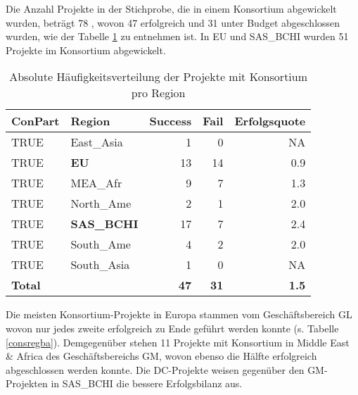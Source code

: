 %
%
Die Anzahl Projekte in der Stichprobe, die in einem Konsortium abgewickelt wurden, beträgt 78 , wovon 47 erfolgreich und 31 unter Budget abgeschlossen wurden, wie der Tabelle \ref{fcons} zu entnehmen ist. In EU und SAS\_BCHI wurden 51 Projekte im Konsortium abgewickelt.
\begin{table}[H]
	\centering
	\caption{Absolute Häufigkeitsverteilung der Projekte mit Konsortium pro Region}
	\begin{tabular}{lrrrr}
		\textbf{ConPart} & \multicolumn{1}{l}{\textbf{Region}} & \multicolumn{1}{l}{\textbf{Success}} & \multicolumn{1}{l}{\textbf{Fail}} & \multicolumn{1}{l}{\textbf{Erfolgsquote}} \\\hline
		TRUE  & \multicolumn{1}{l}{East\_Asia} & 1     & 0     & NA \\
		TRUE  & \multicolumn{1}{l}{\textbf{EU}} & 13    & 14    & 0.9 \\
		TRUE  & \multicolumn{1}{l}{MEA\_Afr} & 9     & 7     & 1.3 \\
		TRUE  & \multicolumn{1}{l}{North\_Ame} & 2     & 1     & 2.0 \\
		TRUE  & \multicolumn{1}{l}{\textbf{SAS\_BCHI}} & 17    & 7     & 2.4 \\
		TRUE  & \multicolumn{1}{l}{South\_Ame} & 4     & 2     & 2.0 \\
		TRUE  & \multicolumn{1}{l}{South\_Asia} & 1     & 0     & NA \\\hline
		\textbf{Total} &       & \textbf{47} & \textbf{31} & \textbf{1.5} \\
	\end{tabular}%
	\label{fcons}%
\end{table}%
Die meisten Konsortium-Projekte in Europa stammen vom Geschäftsbereich GL wovon nur jedes zweite erfolgreich zu Ende geführt werden konnte (s. Tabelle \ref{consregba}). Demgegenüber stehen 11 Projekte mit Konsortium in Middle East \& Africa des Geschäftsbereichs GM, wovon ebenso die Hälfte erfolgreich abgeschlossen werden konnte. Die DC-Projekte weisen gegenüber den GM-Projekten in SAS\_BCHI die bessere Erfolgsbilanz aus.
